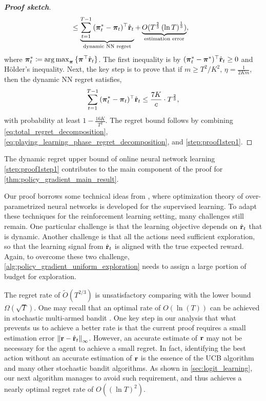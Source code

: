 \begin{proof}[\bf Proof sketch]
\begin{equation}
{\begin{split}
&\le \underbrace{ \sum\limits_{t=1}^{T-1}{ ( {{\boldsymbol{\pi}}_t^*} - {\boldsymbol{\pi}}_t )^\top \hat{{\mathbf{r}}}_t  } }_{\text{dynamic NN regret}} + \underbrace{ O(T^{\frac{2}{3}}\left( \ln{T} \right)^{\frac{1}{3}}) }_{\text{estimation error}},
\end{split}
}
\end{equation}
where ${\boldsymbol{\pi}}_t^* \coloneqq \operatorname*{arg\,max}_{{\boldsymbol{\pi}} }{\{ {\boldsymbol{\pi}}^\top \hat{{\mathbf{r}}}_t\}}$. The first inequality is by $( {\boldsymbol{\pi}}_t^* - {\boldsymbol{\pi}}^*)^\top \hat{{\mathbf{r}}}_t \ge 0$ and H{\" o}lder's inequality. Next, the key step is to prove that if $m \ge T^2 /K^2$, $\eta = \frac{1}{2 K m}$, then the dynamic NN regret satisfies,
\begin{equation}
\label{step:proof1step1}
\begin{split}
\sum\limits_{t=1}^{T-1}{ (  {{\boldsymbol{\pi}}_t^*} - {\boldsymbol{\pi}}_t )^\top \hat{{\mathbf{r}}}_t } \le \frac{7 K}{c} \cdot  T^{\frac{2}{3}},
\end{split}
\end{equation}
with probability at least $1 - \frac{16 K}{T^2}$.
The regret bound follows by combining \cref{eq:total_regret_decomposition}, \cref{eq:playing_learning_phase_regret_decomposition}, and \cref{step:proof1step1}.
\end{proof}
The dynamic regret upper bound of online neural network learning \cref{step:proof1step1} contributes to the main component of the proof for \cref{thm:policy_gradient_main_result}. 


	Our proof borrows some technical ideas from \cite{li2018learning,allen2018convergenceB},  where optimization theory of over-parametrized neural networks is developed for the supervised learning. To adapt these techniques for the reinforcement learning setting, many challenges still remain. One particular challenge is that the learning objective depends on $\hat{{\mathbf{r}}}_t$ that is dynamic. Another challenge is that all the actions need sufficient exploration, so that the learning signal from $\hat{{\mathbf{r}}}_t$ is aligned with the true expected reward. Again, to overcome these two challenge, \cref{alg:policy_gradient_uniform_exploration} needs to assign a large portion of budget for exploration.

\begin{remk}
The regret rate of $\tilde{O}(T^{2/3})$ is unsatisfactory comparing with the lower bound $\Omega(\sqrt{T})$. 
One may recall that an optimal rate of $O(\ln(T))$ can be achieved in stochastic multi-armed bandit \citep{bubeck2012regret}. 
One key step in our analysis that what prevents us to achieve a better rate is that the current proof requires a small estimation error $\left\| {\mathbf{r}} - \hat{{\mathbf{r}}}_t \right\|_\infty$.
However, an accurate estimate of ${\mathbf{r}}$ may not be necessary for the agent to achieve a small regret. 
In fact, identifying the best action without an accurate estimation of ${\mathbf{r}}$ is the essence of the UCB algorithm and many other stochastic bandit algorithms. 
As shown in \cref{sec:logit_learning}, our next algorithm manages to avoid such requirement, and thus achieves a nearly optimal regret rate of $O((\ln T)^2)$.
\end{remk}

